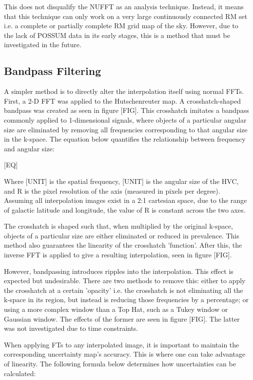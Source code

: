 This does not disqualify the NUFFT as an analysis technique. Instead, it means that this technique can only work on a very large continuously connected RM set i.e. a complete or partially complete RM grid map of the sky. However, due to the lack of POSSUM data in its early stages, this is a method that must be investigated in the future.

\subsection{Bandpass Filtering}
\label{ssec:bandpass}

A simpler method is to directly alter the interpolation itself using normal FFTs. First, a 2-D FFT was applied to the Hutschenreuter map. A crosshatch-shaped bandpass was created as seen in figure [FIG]. This crosshatch imitates a bandpass commonly applied to 1-dimensional signals, where objects of a particular angular size are eliminated by removing all frequencies corresponding to that angular size in the k-space. The equation below quantifies the relationship between frequency and angular size:


[EQ]


Where [UNIT] is the spatial frequency, [UNIT] is the angular size of the HVC, and R is the pixel resolution of the axis (measured in pixels per degree). Assuming all interpolation images exist in a 2:1 cartesian space, due to the range of galactic latitude and longitude, the value of R is constant across the two axes.


The crosshatch is shaped such that, when multiplied by the original k-space, objects of a particular size are either eliminated or reduced in prevalence. This method also guarantees the linearity of the crosshatch 'function'. After this, the inverse FFT is applied to give a resulting interpolation, seen in figure [FIG].


However, bandpassing introduces ripples into the interpolation. This effect is expected but undesirable. There are two methods to remove this: either to apply the crosshatch at a certain 'opacity' i.e. the crosshatch is not eliminating all the k-space in its region, but instead is reducing those frequencies by a percentage; or using a more complex window than a Top Hat, such as a Tukey window or Gaussian window. The effects of the former are seen in figure [FIG]. The latter was not investigated due to time constraints.


When applying FTs to any interpolated image, it is important to maintain the corresponding uncertainty map's accuracy. This is where one can take advantage of linearity. The following formula below determines how uncertainties can be calculated:


